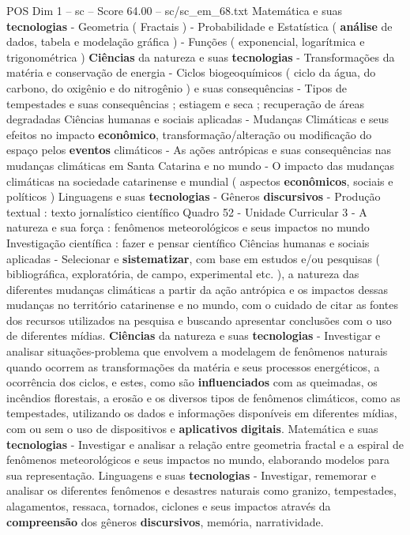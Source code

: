 \begin{textsample}{POS Dim 1 – sc – Score 64.00 – sc/sc\_em\_68.txt}
Matemática e suas \textbf{tecnologias} - Geometria ( Fractais ) - Probabilidade e Estatística ( \textbf{análise} de dados, tabela e modelação gráfica ) - Funções ( exponencial, logarítmica e trigonométrica ) \textbf{Ciências} da natureza e suas \textbf{tecnologias} - Transformações da matéria e conservação de energia - Ciclos biogeoquímicos ( ciclo da água, do carbono, do oxigênio e do nitrogênio ) e suas consequências - Tipos de tempestades e suas consequências ; estiagem e seca ; recuperação de áreas degradadas Ciências humanas e sociais aplicadas - Mudanças Climáticas e seus efeitos no impacto \textbf{econômico}, transformação/alteração ou modificação do espaço pelos \textbf{eventos} climáticos - As ações antrópicas e suas consequências nas mudanças climáticas em Santa Catarina e no mundo - O impacto das mudanças climáticas na sociedade catarinense e mundial ( aspectos \textbf{econômicos}, sociais e políticos ) Linguagens e suas \textbf{tecnologias} - Gêneros \textbf{discursivos} - Produção textual : texto jornalístico científico Quadro 52 - Unidade Curricular 3 - A natureza e sua força : fenômenos meteorológicos e seus impactos no mundo Investigação científica : fazer e pensar científico Ciências humanas e sociais aplicadas - Selecionar e \textbf{sistematizar}, com base em estudos e/ou pesquisas ( bibliográfica, exploratória, de campo, experimental etc. ), a natureza das diferentes mudanças climáticas a partir da ação antrópica e os impactos dessas mudanças no território catarinense e no mundo, com o cuidado de citar as fontes dos recursos utilizados na pesquisa e buscando apresentar conclusões com o uso de diferentes mídias. \textbf{Ciências} da natureza e suas \textbf{tecnologias} - Investigar e analisar situações-problema que envolvem a modelagem de fenômenos naturais quando ocorrem as transformações da matéria e seus processos energéticos, a ocorrência dos ciclos, e estes, como são \textbf{influenciados} com as queimadas, os incêndios florestais, a erosão e os diversos tipos de fenômenos climáticos, como as tempestades, utilizando os dados e informações disponíveis em diferentes mídias, com ou sem o uso de dispositivos e \textbf{aplicativos} \textbf{digitais}.
Matemática e suas \textbf{tecnologias} - Investigar e analisar a relação entre geometria fractal e a espiral de fenômenos meteorológicos e seus impactos no mundo, elaborando modelos para sua representação.
Linguagens e suas \textbf{tecnologias} - Investigar, rememorar e analisar os diferentes fenômenos e desastres naturais como granizo, tempestades, alagamentos, ressaca, tornados, ciclones e seus impactos através da \textbf{compreensão} dos gêneros \textbf{discursivos}, memória, narratividade.

\end{textsample}
